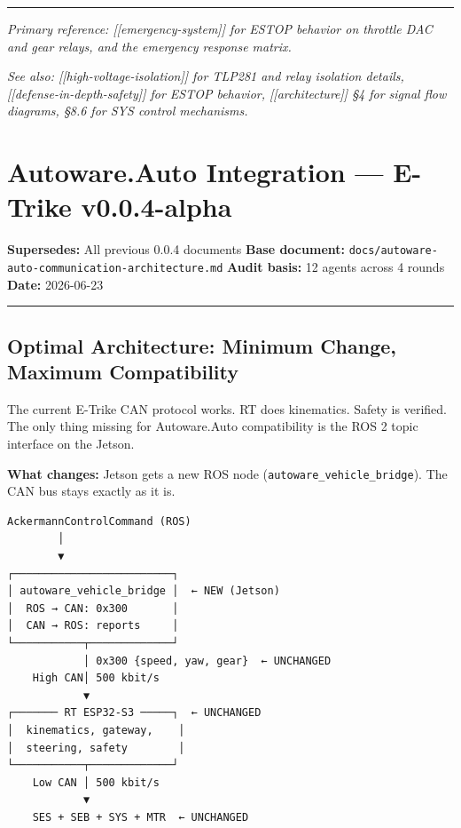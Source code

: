 \documentclass[12pt,a4paper,oneside]{report}
\begin{document}
\begin{center}\rule{0.5\linewidth}{0.5pt}\end{center}

\emph{Primary reference: {[}{[}emergency-system{]}{]} for ESTOP behavior on
throttle DAC and gear relays, and the emergency response matrix.}

\emph{See also: {[}{[}high-voltage-isolation{]}{]} for TLP281 and relay
isolation details, {[}{[}defense-in-depth-safety{]}{]} for ESTOP behavior,
{[}{[}architecture{]}{]} §4 for signal flow diagrams, §8.6 for SYS control
mechanisms.}


\chapter{Autoware.Auto Integration --- E-Trike
v0.0.4-alpha}\label{autoware.auto-integration-e-trike-v0.0.4-alpha}

\textbf{Supersedes:} All previous 0.0.4 documents \textbf{Base document:}
\texttt{docs/autoware-auto-communication-architecture.md} \textbf{Audit basis:}
12 agents across 4 rounds \textbf{Date:} 2026-06-23

\begin{center}\rule{0.5\linewidth}{0.5pt}\end{center}

\section{Optimal Architecture: Minimum Change, Maximum
Compatibility}\label{optimal-architecture-minimum-change-maximum-compatibility}

The current E-Trike CAN protocol works. RT does kinematics. Safety is verified.
The only thing missing for Autoware.Auto compatibility is the ROS 2 topic
interface on the Jetson.

\textbf{What changes:} Jetson gets a new ROS node
(\texttt{autoware\_vehicle\_bridge}). The CAN bus stays exactly as it is.

\begin{verbatim}
AckermannControlCommand (ROS)
        │
        ▼
┌─────────────────────────┐
│ autoware_vehicle_bridge │  ← NEW (Jetson)
│  ROS → CAN: 0x300       │
│  CAN → ROS: reports     │
└───────────┬─────────────┘
            │ 0x300 {speed, yaw, gear}  ← UNCHANGED
    High CAN│ 500 kbit/s
            ▼
┌─────── RT ESP32-S3 ─────┐  ← UNCHANGED
│  kinematics, gateway,    │
│  steering, safety        │
└───────────┬─────────────┘
    Low CAN │ 500 kbit/s
            ▼
    SES + SEB + SYS + MTR  ← UNCHANGED
\end{verbatim}
\end{document}
